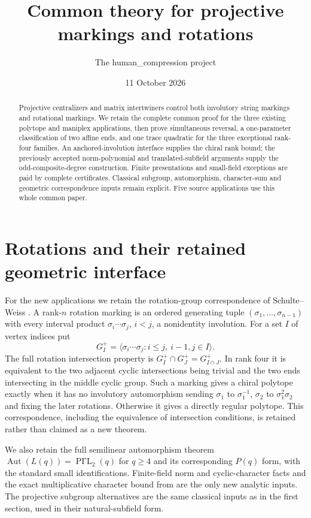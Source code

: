 \documentclass[11pt,a4paper]{article}
\title{Common theory for projective markings and rotations}
\author{The human\_compression project}\date{11 October 2026}
\begin{document}
\maketitle
\begin{abstract}
Projective centralizers and matrix intertwiners control both involutory
string markings and rotational markings. We retain the complete common
proof for the three existing polytope and maniplex applications, then
prove simultaneous reversal, a one-parameter classification of two affine
ends, and one trace quadratic for the three exceptional rank-four families.
An anchored-involution interface supplies the chiral rank bound; the
previously accepted norm-polynomial and translated-subfield arguments
supply the odd-composite-degree construction. Finite presentations and
small-field exceptions are paid by complete certificates. Classical
subgroup, automorphism, character-sum and geometric correspondence inputs
remain explicit. Five source applications use this whole common paper.
\end{abstract}

\section{Rotations and their retained geometric interface}
For the new applications we retain the rotation-group correspondence of
Schulte--Weiss \cite{SW}. A rank-$n$ rotation marking is an ordered
generating tuple $(\sigma_1,\ldots,\sigma_{n-1})$ with every interval
product $\sigma_i\cdots\sigma_j$, $i<j$, a nonidentity involution.
For a set $I$ of vertex indices put
\[
 G_I^+=\langle\sigma_i\cdots\sigma_j:i\le j,\ i-1,j\in I\rangle.
\]
The full rotation intersection property is
$G_I^+\cap G_J^+=G_{I\cap J}^+$. In rank four it is equivalent to
the two adjacent cyclic intersections being trivial and the two ends
intersecting in the middle cyclic group. Such a marking gives a chiral
polytope exactly when it has no involutory automorphism sending
$\sigma_1$ to $\sigma_1^{-1}$, $\sigma_2$ to $\sigma_1^2\sigma_2$
and fixing the later rotations. Otherwise it gives a directly regular
polytope. This correspondence, including the equivalence of intersection
conditions, is retained rather than claimed as a new theorem.

We also retain the full semilinear automorphism theorem
$\operatorname{Aut}(L(q))=\operatorname{P\Gamma L}_2(q)$ for $q\ge4$
and its corresponding $P(q)$ form, with the standard small identifications.
Finite-field norm and cyclic-character facts and the exact multiplicative
character bound from \cite{CKR} are the only new analytic inputs.
The projective subgroup alternatives are the same classical inputs as
in the first section, used in their natural-subfield form.







\end{document}
